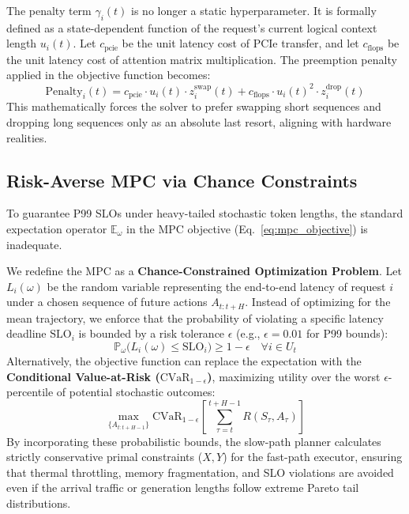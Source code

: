 \documentclass[11pt]{article}
\begin{document}
The penalty term $\gamma_i(t)$ is no longer a static hyperparameter. It is formally defined as a state-dependent function of the request's current logical context length $u_i(t)$. Let $c_{\text{pcie}}$ be the unit latency cost of PCIe transfer, and let $c_{\text{flops}}$ be the unit latency cost of attention matrix multiplication. The preemption penalty applied in the objective function becomes:
\begin{equation}
    \text{Penalty}_i(t) = c_{\text{pcie}} \cdot u_i(t) \cdot z_i^{\text{swap}}(t) + c_{\text{flops}} \cdot u_i(t)^2 \cdot z_i^{\text{drop}}(t)
\end{equation}
This mathematically forces the solver to prefer swapping short sequences and dropping long sequences only as an absolute last resort, aligning with hardware realities.

\subsection{Risk-Averse MPC via Chance Constraints}
\label{subsec:ext_risk_averse_mpc}

To guarantee P99 SLOs under heavy-tailed stochastic token lengths, the standard expectation operator $\mathbb{E}_{\omega}$ in the MPC objective (Eq.~\ref{eq:mpc_objective}) is inadequate. 

We redefine the MPC as a \textbf{Chance-Constrained Optimization Problem}. Let $L_i(\omega)$ be the random variable representing the end-to-end latency of request $i$ under a chosen sequence of future actions $A_{t:t+H}$. Instead of optimizing for the mean trajectory, we enforce that the probability of violating a specific latency deadline $\text{SLO}_i$ is bounded by a risk tolerance $\epsilon$ (e.g., $\epsilon = 0.01$ for P99 bounds):
\begin{equation}
    \mathbb{P}_{\omega} \Big( L_i(\omega) \le \text{SLO}_i \Big) \ge 1 - \epsilon \quad \forall i \in U_t
\end{equation}
Alternatively, the objective function can replace the expectation with the \textbf{Conditional Value-at-Risk ($\text{CVaR}_{1-\epsilon}$)}, maximizing utility over the worst $\epsilon$-percentile of potential stochastic outcomes:
\begin{equation}
    \max_{\{A_{t:t+H-1}\}} \text{CVaR}_{1-\epsilon} \left[ \sum_{\tau=t}^{t+H-1} R(S_\tau, A_\tau) \right]
\end{equation}
By incorporating these probabilistic bounds, the slow-path planner calculates strictly conservative primal constraints ($X, Y$) for the fast-path executor, ensuring that thermal throttling, memory fragmentation, and SLO violations are avoided even if the arrival traffic or generation lengths follow extreme Pareto tail distributions.
\end{document}
